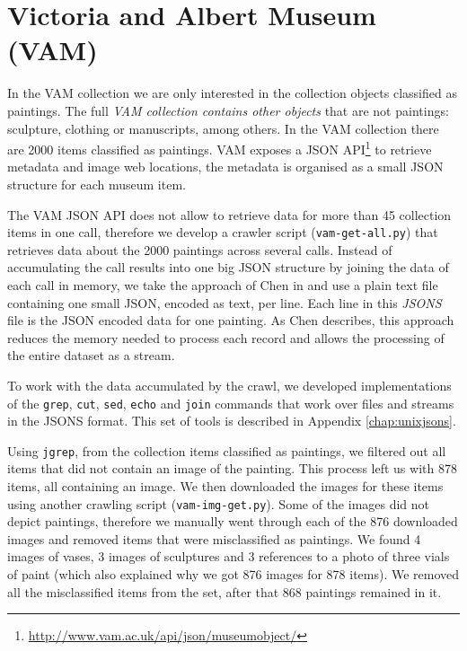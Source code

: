 \documentclass[11pt,a4paper,twoside,openright]{report}
\begin{document}
\section{Victoria and Albert Museum (VAM)}

In the VAM collection we are only interested in the collection objects
classified as paintings.  The full \emph{VAM collection contains other objects}
that are not paintings: sculpture, clothing or manuscripts, among others.  In
the VAM collection there are 2000 items classified as paintings.  VAM exposes a
JSON API\footnote{\href{http://www.vam.ac.uk/api/json/museumobject/}
{http://www.vam.ac.uk/api/json/museumobject/}} to retrieve metadata and image
web locations, the metadata is organised as a small JSON structure for each
museum item.

The VAM JSON API does not allow to retrieve data for more than 45 collection
items in one call, therefore we develop a crawler script
(\texttt{vam-get-all.py}) that retrieves data about the 2000 paintings across
several calls.  Instead of accumulating the call results into one big JSON
structure by joining the data of each call in memory, we take the approach of
Chen in \cite{chen09yahoo} and use a plain text file containing one small JSON,
encoded as text, per line.  Each line in this \emph{JSONS} file is the JSON
encoded data for one painting.  As Chen \cite{chen09yahoo} describes, this
approach reduces the memory needed to process each record and allows the
processing of the entire dataset as a stream.

To work with the data accumulated by the crawl, we developed implementations of
the \texttt{grep}, \texttt{cut}, \texttt{sed}, \texttt{echo} and \texttt{join}
commands that work over files and streams in the JSONS format.  This set of
tools is described in Appendix \ref{chap:unixjsons}.

Using \texttt{jgrep}, from the collection items classified as paintings, we
filtered out all items that did not contain an image of the painting.  This
process left us with 878 items, all containing an image.  We then downloaded
the images for these items using another crawling script
(\texttt{vam-img-get.py}).  Some of the images did not depict paintings,
therefore we manually went through each of the 876 downloaded images and
removed items that were misclassified as paintings.  We found 4 images of
vases, 3 images of sculptures and 3 references to a photo of three vials of
paint (which also explained why we got 876 images for 878 items).  We removed
all the misclassified items from the set, after that 868 paintings remained in
it.
\end{document}
